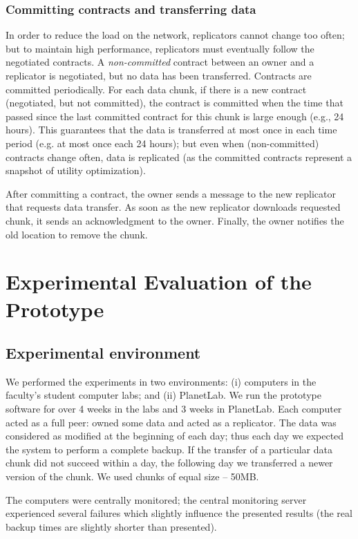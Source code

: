 \documentclass[10pt, final, conference, letterpaper]{IEEEtran}
\begin{document}
\subsubsection{Committing contracts and transferring data}

In order to reduce the load on the network, replicators cannot change too often; but to maintain high performance, replicators must eventually follow the negotiated contracts. A \emph{non-committed} contract between an owner and a replicator is negotiated, but no data has been transferred. Contracts are committed periodically. For each data chunk, if there is a new contract (negotiated, but not committed), the contract is committed when the time that passed since the last committed contract for this chunk is large enough (e.g., 24 hours). This guarantees that the data is transferred at most once in each time period (e.g. at most once each 24 hours); but even when (non-committed) contracts change often, data is replicated (as the committed contracts represent a snapshot of utility optimization).

After committing a contract, the owner sends a message to the new replicator that requests data transfer. As soon as the new replicator downloads requested chunk, it sends an acknowledgment to the owner. Finally, the owner notifies the old location to remove the chunk.


\section{Experimental Evaluation of the Prototype}\label{sec::experiments}

\subsection{Experimental environment}

We performed the experiments in two environments: (i) computers in the faculty's student computer labs; and (ii) PlanetLab. We run the prototype software for over 4 weeks in the labs and 3 weeks in PlanetLab. Each computer acted as a full peer: owned some data and acted as a replicator. The data was considered as modified at the beginning of each day; thus each day we expected the system to perform a complete backup. If the transfer of a particular data chunk did not succeed within a day, the following day we transferred a newer version of the chunk. We used chunks of equal size -- 50MB.

The computers were centrally monitored; the central monitoring server experienced several failures which slightly influence the presented results (the real backup times are  slightly shorter than presented).
\end{document}
